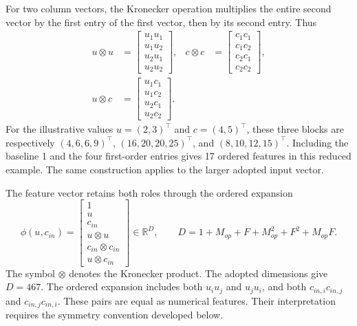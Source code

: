 For two column vectors, the Kronecker operation multiplies the entire second vector by the first entry of the first vector, then by its second entry. Thus
\begin{equation}
\label{eq:icsor_small_kronecker}
\begin{aligned}
u\otimes u&=\begin{bmatrix}u_1u_1\\u_1u_2\\u_2u_1\\u_2u_2\end{bmatrix},
&c\otimes c&=\begin{bmatrix}c_1c_1\\c_1c_2\\c_2c_1\\c_2c_2\end{bmatrix},\\
u\otimes c&=\begin{bmatrix}u_1c_1\\u_1c_2\\u_2c_1\\u_2c_2\end{bmatrix}.
\end{aligned}
\end{equation}
For the illustrative values \(u=(2,3)^\top\) and \(c=(4,5)^\top\), these three blocks are respectively \((4,6,6,9)^\top\), \((16,20,20,25)^\top\), and \((8,10,12,15)^\top\). Including the baseline 1 and the four first-order entries gives 17 ordered features in this reduced example. The same construction applies to the larger adopted input vector.

The feature vector retains both roles through the ordered expansion
\begin{equation}
\label{eq:icsor_features}
\phi(u,c_{in})=
\begin{bmatrix}
1\\u\\c_{in}\\u\otimes u\\c_{in}\otimes c_{in}\\u\otimes c_{in}
\end{bmatrix}
\in\mathbb{R}^{D},
\qquad
D=1+M_{op}+F+M_{op}^{2}+F^{2}+M_{op}F.
\end{equation}
The symbol \(\otimes\) denotes the Kronecker product. The adopted dimensions give \(D=467\). The ordered expansion includes both \(u_i u_j\) and \(u_j u_i\), and both \(c_{in,i}c_{in,j}\) and \(c_{in,j}c_{in,i}\). These pairs are equal as numerical features. Their interpretation requires the symmetry convention developed below.

